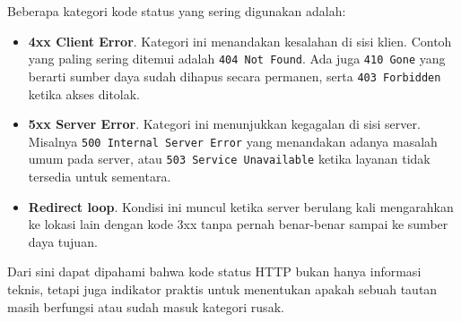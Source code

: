 Beberapa kategori kode status yang sering digunakan adalah:
\begin{itemize}
  \item \textbf{4xx Client Error}. Kategori ini menandakan kesalahan di sisi klien. Contoh yang paling sering ditemui adalah \texttt{404 Not Found}. Ada juga \texttt{410 Gone} yang berarti sumber daya sudah dihapus secara permanen, serta \texttt{403 Forbidden} ketika akses ditolak.
  \item \textbf{5xx Server Error}. Kategori ini menunjukkan kegagalan di sisi server. Misalnya \texttt{500 Internal Server Error} yang menandakan adanya masalah umum pada server, atau \texttt{503 Service Unavailable} ketika layanan tidak tersedia untuk sementara.
  \item \textbf{Redirect loop}. Kondisi ini muncul ketika server berulang kali mengarahkan ke lokasi lain dengan kode 3xx tanpa pernah benar-benar sampai ke sumber daya tujuan.
\end{itemize}

Dari sini dapat dipahami bahwa kode status HTTP bukan hanya informasi teknis, tetapi juga indikator praktis untuk menentukan apakah sebuah tautan masih berfungsi atau sudah masuk kategori rusak.